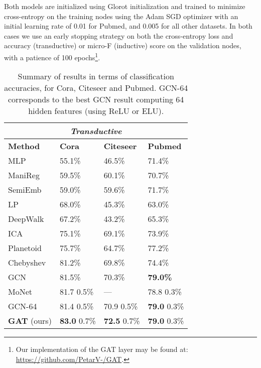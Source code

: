 \documentclass{article} \usepackage{iclr2018_conference,times}
\begin{document}
Both models are initialized using Glorot initialization \citep{glorot2010understanding} and trained to minimize cross-entropy on the training nodes using the Adam SGD optimizer \citep{kingma2014adam} with an initial learning rate of 0.01 for Pubmed, and 0.005 for all other datasets. In both cases we use an early stopping strategy on both the cross-entropy loss and accuracy (transductive) or micro-F (inductive) score on the validation nodes, with a patience of 100 epochs\footnote{Our implementation of the GAT layer may be found at: \url{https://github.com/PetarV-/GAT}.}.

\begin{table}[ht!]
\caption{Summary of results in terms of classification accuracies, for Cora, Citeseer and Pubmed. GCN-64 corresponds to the best GCN result computing 64 hidden features (using ReLU or ELU).}
\label{transtable}
\begin{center}
\begin{tabular}{l l l l}
\multicolumn{4}{c}{\textbf{\emph{Transductive}}}\\
\toprule
{\bf Method} & {\bf Cora} & {\bf Citeseer} & {\bf Pubmed}\\ \midrule
MLP & 55.1\% & 46.5\% & 71.4\% \\
ManiReg \citep{belkin2006manifold} & 59.5\% & 60.1\% & 70.7\%\\
SemiEmb \citep{weston2012deep} & 59.0\% & 59.6\% & 71.7\%\\
LP \citep{zhu2003semi} & 68.0\% & 45.3\% & 63.0\%\\
DeepWalk \citep{perozzi2014deepwalk} & 67.2\% & 43.2\% & 65.3\%\\
ICA \citep{lu2003link} & 75.1\% & 69.1\% & 73.9\%\\
Planetoid \citep{yang2016revisiting} & 75.7\% & 64.7\% & 77.2\%\\
Chebyshev \citep{defferrard2016convolutional} & 81.2\% & 69.8\% & 74.4\%\\
GCN \citep{kipf2016semi} & 81.5\% & 70.3\% & {\bf 79.0\%}\\
MoNet \citep{monti2016geometric} & 81.7  0.5\% & --- & 78.8  0.3\%\\ \midrule
GCN-64 & 81.4  0.5\% & 70.9  0.5\% & {\bf 79.0}  0.3\%\\
{\bf GAT} (ours) & {\bf 83.0}  0.7\% & {\bf 72.5}  0.7\% & {\bf 79.0}  0.3\%\\\bottomrule \end{tabular}
\end{center}
\end{table}
\end{document}
